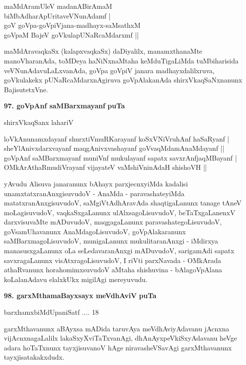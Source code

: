 \begin{shloka}
maMdAramUleV madanABirAmaM\\
biMbAdharApUritaveVNunAdamf |\\
goV goVpa-goVpiVjana-madhayx-saMsathxM \\
goVpaM BajeV goVkulapUNaRcaMdarxmf ||
\end{shloka}

maMdAravaqkaSx (kalapxvaqkaSx) daDiyalilx, manamxthanaMte manoVharanAda, toMDeya haNiNxnaMtaha keMduTigaLiMda tuMbiharisida veVNunAdavuLaLxvanAda, goVpa goVpiV janara madhayxdalilxruva, goVkulakekx pUNaRcaMdarxnAgiruva goVpAlakanAda shirxVkaqSaNxnanunx BajisutetxVne.


\smallskip
\noindent
\textbf{97. goVpAnf saMBarxmayanf} \hfill{\bf puTa \pageref{229}}

\hfill{shirxVkaqSanx lahariV}

\begin{shloka}
loVkAnunamxdayanf shurxtiVmuRKarayanf koSxVNiVruhAnf haSaRyanf |\\
sheYlAnivxdarxvayanf maqgAnivxvashayanf goVvaqMdamAnaMdayanf ||\\
goVpAnf saMBarxmayanf muniVnf mukulayanf sapatx savxrAnfjaqMBayanf |\\
OMkArAthaRmudiVrayanf vijayateV vaMshiVninAdaH shishoVH ||
\end{shloka}

\smallskip
yAvudu Alisuva janaranunx bAhayx parxjecnxyiMda kadalisi unamxtatxranAnxgisuvudoV  - AnaMda - paravashateyiMda matatxranAnxgisuvudoV, saMgiVtAdhAravAda shaqtigaLanunx tanage tAneV moLagisuvudoV, vaqkaSxgaLanunx ulAlxsagoLisuvudoV, beTaTxgaLanenxV darxvisuvaMte mADuvudoV, maqgagaLanunx paravashategoLisuvudoV, goVsamUhavanunx AnaMdagoLisuvudoV, goVpAlakaranunx saMBarxmagoLisuvudoV, munigaLanunx mukulitaranAnxgi - iMdirxya manasusxgaLanunx oLa seLedavaranAnxgi mADuvudoV, sarigamAdi sapatx savxragaLanunx visAtxragoLisuvudoV, I riVti parxNavada - OMkArada athaRvanunx horahomimxsuvudoV aMtaha shishuvina - bAlagoVpAlana koLalanAdavu elalxkUkx migilAgi mereyuvudu.

\medskip
\noindent
\textbf{98. garxMthamaBayxsayx meVdhAviV} \hfill{\bf puTa \pageref{42c}}

\hfill{barxhamxbiMdUpaniSatf .... 18}

\smallskip
garxMthavanunx aBAyxsa mADida taruvAya meVdhAviyAdavanu jAcnxna vijAcnxnagaLalilx lakaSxyXviTaTxvanAgi, dhAnAyxpeVkiSxyAdavanu heVge adara hoTaTxnunx tayxjisuvanoV hAge niravasheVSavAgi garxMthavanunx tayxjisatakakxdudx.

